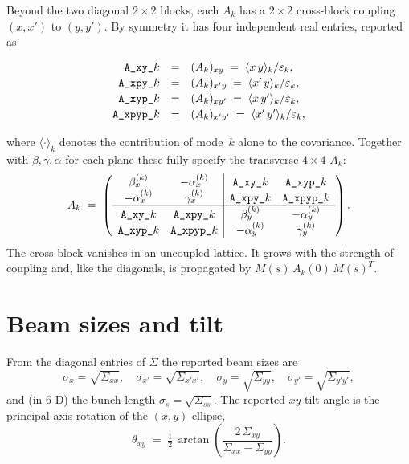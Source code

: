 \documentclass[11pt]{article}
\begin{document}
Beyond the two diagonal $2\times 2$ blocks, each $A_k$ has a $2\times 2$
cross-block coupling $(x,x')$ to $(y,y')$. By symmetry it has four
independent real entries, reported as

\[
\begin{array}{rcl}
\verb|A_xy_|k   &=& (A_k)_{xy}   \;=\; \langle x\,y \rangle_k / \varepsilon_k , \\[2pt]
\verb|A_xpy_|k  &=& (A_k)_{x'y}  \;=\; \langle x'\,y \rangle_k / \varepsilon_k , \\[2pt]
\verb|A_xyp_|k  &=& (A_k)_{xy'}  \;=\; \langle x\,y' \rangle_k / \varepsilon_k , \\[2pt]
\verb|A_xpyp_|k &=& (A_k)_{x'y'} \;=\; \langle x'\,y' \rangle_k / \varepsilon_k ,
\end{array}
\]

where $\langle\cdot\rangle_k$ denotes the contribution of mode~$k$ alone to the
covariance. Together with $\beta,\gamma,\alpha$ for each plane these
fully specify the transverse $4\times 4$ $A_k$:
\[
A_k \;=\;
\left(
\begin{array}{cc|cc}
\beta_x^{(k)}      & -\alpha_x^{(k)}     & \verb|A_xy_|k     & \verb|A_xyp_|k \\
-\alpha_x^{(k)}    & \gamma_x^{(k)}      & \verb|A_xpy_|k    & \verb|A_xpyp_|k \\
\hline
\verb|A_xy_|k      & \verb|A_xpy_|k      & \beta_y^{(k)}     & -\alpha_y^{(k)} \\
\verb|A_xyp_|k     & \verb|A_xpyp_|k     & -\alpha_y^{(k)}   & \gamma_y^{(k)}
\end{array}
\right) .
\]
The cross-block vanishes in an uncoupled lattice. It grows with the
strength of coupling and, like the diagonals, is propagated by
$M(s)\,A_k(0)\,M(s)^T$.

\section{Beam sizes and tilt}

From the diagonal entries of $\Sigma$ the reported beam sizes are
\[
   \sigma_x = \sqrt{\Sigma_{xx}}, \quad
   \sigma_{x'} = \sqrt{\Sigma_{x'x'}}, \quad
   \sigma_y = \sqrt{\Sigma_{yy}}, \quad
   \sigma_{y'} = \sqrt{\Sigma_{y'y'}},
\]
and (in 6-D) the bunch length $\sigma_s = \sqrt{\Sigma_{ss}}$. The reported
$xy$ tilt angle is the principal-axis rotation of the $(x,y)$ ellipse,
\[
   \theta_{xy} \;=\;
   \tfrac{1}{2}\,\arctan\!\left(
     \frac{2\,\Sigma_{xy}}{\Sigma_{xx} - \Sigma_{yy}}
   \right) .
\]
\end{document}
